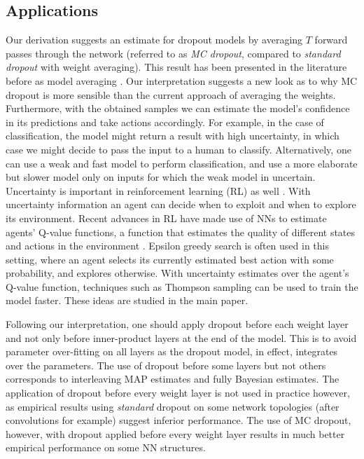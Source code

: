 \documentclass{article} %
\theoremstyle{definition}
\begin{document}
\subsection{Applications}

Our derivation suggests an estimate for dropout models by averaging $T$ forward passes through the network (referred to as \textit{MC dropout}, compared to \textit{standard dropout} with weight averaging).
This result has been presented in the literature before as model averaging \citep{srivastava2014dropout}. 
Our interpretation suggests a new look as to why MC dropout is more sensible than the current approach of averaging the weights. Furthermore, with the obtained samples we can estimate the model's confidence in its predictions and take actions accordingly. For example, in the case of classification, the model might return a result with high uncertainty, in which case we might decide to pass the input to a human to classify. Alternatively, one can use a weak and fast model to perform classification, and use a more elaborate but slower model only on inputs for which the weak model in uncertain. Uncertainty is important in reinforcement learning (RL) as well \citep{szepesvari2010algorithms}. With uncertainty information an agent can decide when to exploit and when to explore its environment. Recent advances in RL have made use of NNs to estimate agents' Q-value functions, a function that estimates the quality of different states and actions in the environment \citep{mnih2013playing}. Epsilon greedy search is often used in this setting, where an agent selects its currently estimated best action with some probability, and explores otherwise. With uncertainty estimates over the agent's Q-value function, techniques such as Thompson sampling \citep{thompson1933likelihood} can be used to train the model faster. These ideas are studied in the main paper.

Following our interpretation, one should apply dropout before each weight layer and not only before inner-product layers at the end of the model. This is to avoid parameter over-fitting on all layers as the dropout model, in effect, integrates over the parameters. The use of dropout before some layers but not others corresponds to interleaving MAP estimates and fully Bayesian estimates. The application of dropout before every weight layer is not used in practice however, as empirical results using \textit{standard} dropout on some network topologies (after convolutions for example) suggest inferior performance. The use of MC dropout, however, with dropout applied before every weight layer results in much better empirical performance on some NN structures. 
\end{document}
